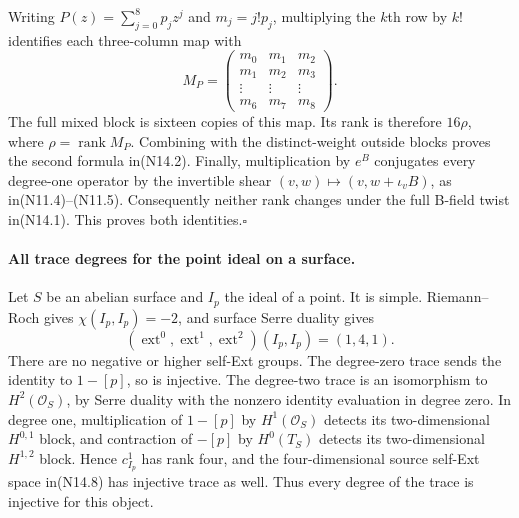 Writing $P(z)=\sum_{j=0}^8p_jz^j$ and $m_j=j!p_j$, multiplying
the $k$th row by $k!$ identifies each three-column map with
\[
 M_P=\begin{pmatrix}
 m_0&m_1&m_2\\
 m_1&m_2&m_3\\
 \vdots&\vdots&\vdots\\
 m_6&m_7&m_8
 \end{pmatrix}.                                          \tag{N14.7}
\]
The full mixed block is sixteen copies of this map. Its rank
is therefore $16\rho$, where $\rho=\operatorname{rank}M_P$.
Combining with the distinct-weight outside blocks proves the
second formula in(N14.2).
Finally, multiplication by $e^B$ conjugates every degree-one
operator by the invertible shear
$(v,w)\mapsto(v,w+\iota_vB)$, as in(N11.4)--(N11.5).
Consequently neither rank changes under the full B-field
twist in(N14.1). This proves both identities.\hfill$\square$

\paragraph{All trace degrees for the point ideal on a surface.}
Let $S$ be an abelian surface and $I_p$ the ideal of a point.
It is simple. Riemann--Roch gives
$\chi(I_p,I_p)=-2$, and surface Serre duality gives
\[
 (\operatorname{ext}^0,\operatorname{ext}^1,
                   \operatorname{ext}^2)(I_p,I_p)=(1,4,1).
                                                               \tag{N14.8}
\]
There are no negative or higher self-Ext groups.
The degree-zero trace sends the identity to
$1-[p]$, so is injective. The degree-two trace is an
isomorphism to $H^2(\mathcal O_S)$, by Serre duality with
the nonzero identity evaluation in degree zero.
In degree one, multiplication of $1-[p]$ by
$H^1(\mathcal O_S)$ detects its two-dimensional $H^{0,1}$
block, and contraction of $-[p]$ by $H^0(T_S)$ detects
its two-dimensional $H^{1,2}$ block. Hence $c_{I_p}^1$
has rank four, and the four-dimensional source self-Ext
space in(N14.8) has injective trace as well.
Thus every degree of the trace is injective for this object.

